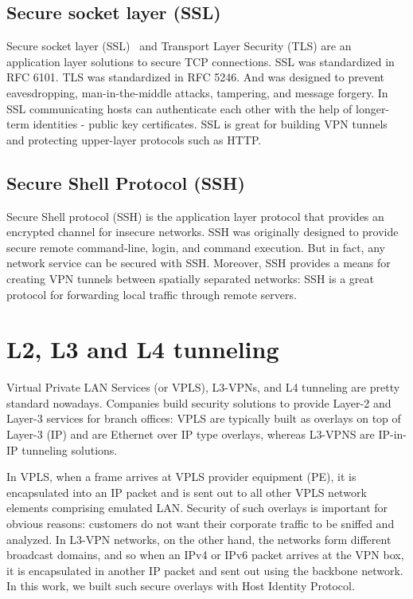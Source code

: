 \subsection{Secure socket layer (SSL)}
Secure socket layer (SSL)~\cite{ssl} and Transport Layer Security (TLS) are an application 
layer solutions to secure TCP connections. SSL was standardized in RFC 6101. 
TLS was standardized in RFC 5246. And was designed to prevent eavesdropping, 
man-in-the-middle attacks, tampering, and message forgery. In SSL communicating 
hosts can authenticate each other with the help of longer-term identities - public key certificates.
SSL is great for building VPN tunnels and protecting upper-layer protocols such as HTTP.


\subsection{Secure Shell Protocol (SSH)}

Secure Shell protocol (SSH) is the application layer protocol that provides an encrypted channel 
for insecure networks. SSH was originally designed to provide secure remote command-line, login, 
and command execution. But in fact, any network service can be secured with SSH. Moreover, SSH 
provides a means for creating VPN tunnels between spatially separated networks: SSH is a great 
protocol for forwarding local traffic through remote servers. 

\section{L2, L3 and L4 tunneling}

Virtual Private LAN Services (or VPLS), L3-VPNs, and L4 tunneling are pretty standard nowadays. 
Companies build security solutions to provide Layer-2 and Layer-3 services for branch offices: 
VPLS are typically built as overlays on top of Layer-3 (IP) and are Ethernet over IP type 
overlays, whereas L3-VPNS are IP-in-IP tunneling solutions.

In VPLS, when a frame arrives at VPLS provider equipment (PE), it is encapsulated 
into an IP packet and is sent out to all other VPLS network elements comprising emulated LAN. 
Security of such overlays is important for obvious reasons: customers do not want their corporate 
traffic to be sniffed and analyzed. In L3-VPN networks, on the other hand, the networks form different 
broadcast domains, and so when an IPv4 or IPv6 packet arrives at the VPN box, it is encapsulated in another 
IP packet and sent out using the backbone network. In this work, we built such secure overlays with 
Host Identity Protocol. 

